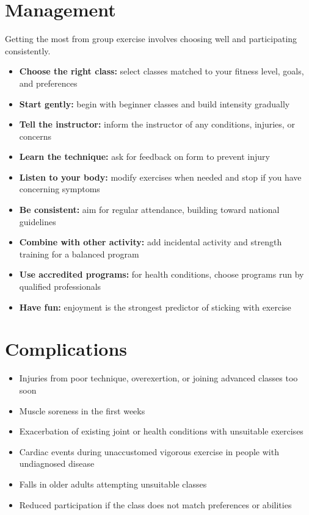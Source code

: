 \section*{Management}
Getting the most from group exercise involves choosing well and participating consistently.

\begin{itemize}
    \item \textbf{Choose the right class:} select classes matched to your fitness level, goals, and preferences
    \item \textbf{Start gently:} begin with beginner classes and build intensity gradually
    \item \textbf{Tell the instructor:} inform the instructor of any conditions, injuries, or concerns
    \item \textbf{Learn the technique:} ask for feedback on form to prevent injury
    \item \textbf{Listen to your body:} modify exercises when needed and stop if you have concerning symptoms
    \item \textbf{Be consistent:} aim for regular attendance, building toward national guidelines
    \item \textbf{Combine with other activity:} add incidental activity and strength training for a balanced program
    \item \textbf{Use accredited programs:} for health conditions, choose programs run by qualified professionals
    \item \textbf{Have fun:} enjoyment is the strongest predictor of sticking with exercise
\end{itemize}

\section*{Complications}
\begin{itemize}
    \item Injuries from poor technique, overexertion, or joining advanced classes too soon
    \item Muscle soreness in the first weeks
    \item Exacerbation of existing joint or health conditions with unsuitable exercises
    \item Cardiac events during unaccustomed vigorous exercise in people with undiagnosed disease
    \item Falls in older adults attempting unsuitable classes
    \item Reduced participation if the class does not match preferences or abilities
\end{itemize}

